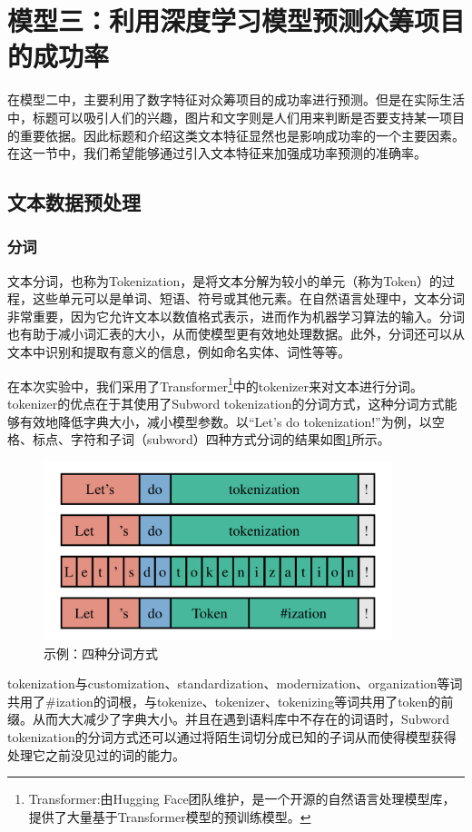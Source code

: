 \documentclass[lang=cn,a4paper]{elegantpaper}
\begin{document}
\section{模型三：利用深度学习模型预测众筹项目的成功率}
在模型二中，主要利用了数字特征对众筹项目的成功率进行预测。但是在实际生活中，标题可以吸引人们的兴趣，图片和文字则是人们用来判断是否要支持某一项目的重要依据。因此标题和介绍这类文本特征显然也是影响成功率的一个主要因素。在这一节中，我们希望能够通过引入文本特征来加强成功率预测的准确率。
\subsection{文本数据预处理}
\subsubsection{分词}
文本分词，也称为Tokenization，是将文本分解为较小的单元（称为Token）的过程，这些单元可以是单词、短语、符号或其他元素。在自然语言处理中，文本分词非常重要，因为它允许文本以数值格式表示，进而作为机器学习算法的输入。分词也有助于减小词汇表的大小，从而使模型更有效地处理数据。此外，分词还可以从文本中识别和提取有意义的信息，例如命名实体、词性等等。

在本次实验中，我们采用了Transformer\footnote{Transformer:由Hugging Face团队维护，是一个开源的自然语言处理模型库，提供了大量基于Transformer模型的预训练模型。}中的tokenizer来对文本进行分词。tokenizer的优点在于其使用了Subword tokenization的分词方式，这种分词方式能够有效地降低字典大小，减小模型参数。以“Let's do tokenization!”为例，以空格、标点、字符和子词（subword）四种方式分词的结果如图\ref{fig:tokenization}所示。

\begin{figure}[!htbp]
  \centering
  \includegraphics[width=4in]{image/tokenization.pdf}
  \caption{示例：四种分词方式}
  \label{fig:tokenization}
\end{figure}

tokenization与customization、standardization、modernization、organization等词共用了\#ization的词根，与tokenize、tokenizer、tokenizing等词共用了token的前缀。从而大大减少了字典大小。并且在遇到语料库中不存在的词语时，Subword tokenization的分词方式还可以通过将陌生词切分成已知的子词从而使得模型获得处理它之前没见过的词的能力。
\end{document}
